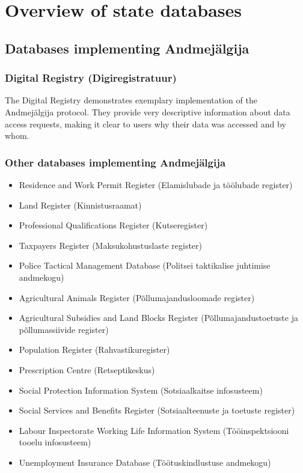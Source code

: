 \section{Overview of state databases} \label{Overview of state databases}

\subsection{Databases implementing Andmejälgija}

\subsubsection{Digital Registry (Digiregistratuur)}
The Digital Registry demonstrates exemplary implementation of the Andmejälgija protocol. They provide very descriptive information about data access requests, making it clear to users why their data was accessed and by whom.

\subsubsection{Other databases implementing Andmejälgija}
\begin{itemize}
    \item Residence and Work Permit Register (Elamislubade ja töölubade register)
    \item Land Register (Kinnistusraamat)
    \item Professional Qualifications Register (Kutseregister)
    \item Taxpayers Register (Maksukohustuslaste register)
    \item Police Tactical Management Database (Politsei taktikalise juhtimise andmekogu)
    \item Agricultural Animals Register (Põllumajandusloomade register)
    \item Agricultural Subsidies and Land Blocks Register (Põllumajandustoetuste ja põllumassiivide register)
    \item Population Register (Rahvastikuregister)
    \item Prescription Centre (Retseptikeskus)
    \item Social Protection Information System (Sotsiaalkaitse infosusteem)
    \item Social Services and Benefits Register (Sotsiaalteenuste ja toetuste register)
    \item Labour Inspectorate Working Life Information System (Tööinspektsiooni tooelu infosusteem)
    \item Unemployment Insurance Database (Töötuskindlustuse andmekogu)
\end{itemize}

